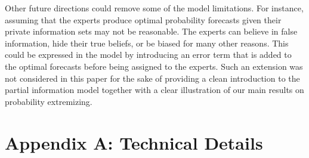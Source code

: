 \documentclass[11pt]{article}
\theoremstyle{definition}
\theoremstyle{definition}
\begin{document}
 
 Other future directions could  remove some of the model limitations. For instance, assuming that the experts produce optimal probability forecasts given their private information sets may not be reasonable. The experts can believe in false information, hide their true beliefs, or be biased for many other reasons. This could be expressed in the model by introducing an error term that is added to the optimal forecasts before being assigned to the experts. Such an extension was not considered in this paper for the sake of providing a clean introduction to the partial information model together with a clear illustration of our main results on  probability extremizing. 
 
 
% 

 \appendix 
\section*{Appendix A: Technical Details}
\label{appendix}
\end{document}
